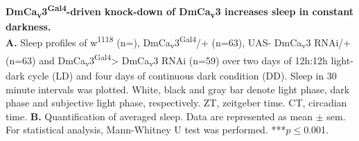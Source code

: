 \label{fig:S3}
\textbf{DmCa\textsubscript{v}3\textsuperscript{Gal4}-driven knock-down of DmCa\textsubscript{v}3 increases sleep in constant darkness.}
\\
\textbf{A.} Sleep profiles of w\textsuperscript{1118} (n=), DmCa\textsubscript{v}3\textsuperscript{Gal4}/+ (n=63), UAS- DmCa\textsubscript{v}3 RNAi/+ (n=63) and DmCa\textsubscript{v}3\textsuperscript{Gal4}> DmCa\textsubscript{v}3 RNAi (n=59) over two days of 12h:12h light-dark cycle (LD) and four days of continuous dark condition (DD).
Sleep in 30 minute intervals was plotted.
White, black and gray bar denote light phase, dark phase and subjective light phase, respectively.
ZT, zeitgeber time.
CT, circadian time.
\textbf{B.} Quantification of averaged sleep.
Data are represented as mean $\pm$ sem.
For statistical analysis, Mann-Whitney U test was performed.
***$p\le$0.001.
  